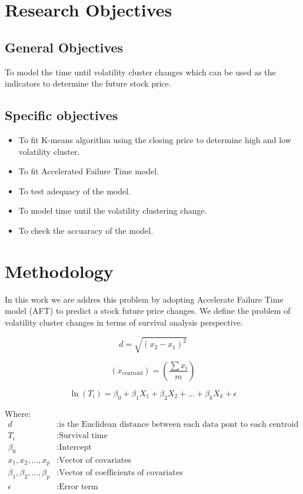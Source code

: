 \documentclass[twoside,a4paper,12pt]{article}
\begin{document}
\section*{Research Objectives} 
\subsection*{General Objectives}To model the time until volatility cluster changes which can be used as the indicators to determine the future stock price.
\subsection*{Specific objectives}
\begin{itemize}
	\item To fit  K-means algorithm using the closing price to determine high and low volatility cluster.
	\item To fit   Accelerated Failure Time model.
	\item  To test adequacy of the model.
	\item To model  time until the volatility clustering change.
	\item To check the accuaracy of the model.
	
	
\end{itemize}

\section*{Methodology} In this work we are addres this problem by adopting Accelerate Failure Time model (AFT) to predict a stock future price changes. We define the problem of volatility cluster changes in terms of survival analysis perspective.  


\begin{equation}
d = \sqrt{(x_2 - x_1)^2 }
\end{equation}


\begin{equation}
(x_{\text{centroid}}) = (\frac{\sum{x_i}}{m})
\end{equation}

\begin{equation}	
		\ln(T_i) = \beta_0 + \beta_1 X_1 + \beta_2 X_2 + \dots + \beta_k X_k + \epsilon \label{eq:1} 	
\end{equation}

Where:
\begin{align*}
d &: \text{is the Euclidean distance between each data pont to each centroid}\\
T_i & : \text{Survival time} \\
\beta_0 & : \text{Intercept} \\
x_1, x_2, \dots, x_p & : \text{Vector of covariates} \\
\beta_1, \beta_2, \dots, \beta_p & : \text{Vector of coefficients of covariates} \\
\epsilon & : \text{Error term}
\end{align*}
\end{document}
